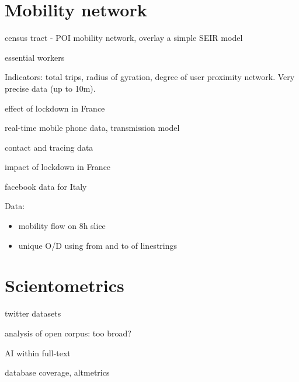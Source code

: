 \documentclass[10pt]{article}
\begin{document}
	
\section{Mobility network}


\cite{chang2020mobility} census tract - POI mobility network, overlay a simple SEIR model

\cite{batty2020london} essential workers

	
\cite{Pepe2020.03.22.20039933} Indicators: total trips, radius of gyration, degree of user proximity network. Very precise data (up to 10m).

\cite{pullano2020population} effect of lockdown in France



\cite{jia2020population} real-time mobile phone data, transmission model

\cite{Zhangeabb8001} contact and tracing data


\cite{salje:pasteur-02548181} impact of lockdown in France


\cite{Bonaccorsi15530} facebook data for Italy
	
\cite{kissler2020reductions}
	
Data:

\begin{itemize}
	\item mobility flow on 8h slice
	\item unique O/D using from and to of linestrings
\end{itemize}





\section{Scientometrics}

\cite{inuwadutse2020curated} twitter datasets

\cite{Colavizza2020.04.20.046144} analysis of open corpus: too broad?

\cite{khamsi2020coronavirus} AI within full-text

\cite{2020arXiv200410400K} database coverage, altmetrics

	
	
	
	


	
	
\end{document}
